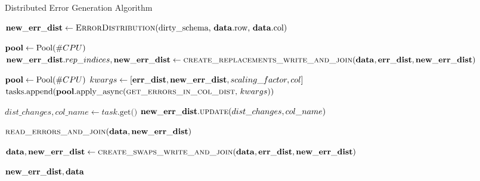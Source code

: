 \begin{algorithm}[!t]
    \caption{Distributed Error Generation Algorithm}\label{alg:dist_generator}
    \begin{algorithmic}[1] 
	  
	  \STATE $\mathbf{new\_err\_dist} \leftarrow \text{\textsc{ErrorDistribution}(dirty\_schema, \ensuremath{\mathbf{data}}.row, \ensuremath{\mathbf{data}}.col)}$
	  
	  
	  \STATE $\mathbf{pool} \leftarrow \text{Pool}(\#CPU)$
	   {
        \STATE $\mathbf{new\_err\_dist}.rep\_indices, \mathbf{new\_err\_dist} \leftarrow \textsc{create\_replacements\_write\_and\_join}(\mathbf{data}, \mathbf{err\_dist}, \mathbf{new\_err\_dist})$ 
      }\ENDFOR
	  
	  
	  \STATE $\mathbf{pool} \leftarrow \text{Pool}(\#CPU)$
	   {
	    \STATE $kwargs \leftarrow [\mathbf{err\_dist}, \mathbf{new\_err\_dist}, scaling\_factor, col]$ 
        \STATE $\text{tasks.append(\ensuremath{\mathbf{pool}}.apply\_async(\textsc{get\_errors\_in\_col\_dist},} \ kwargs\text{))}$ 
      }\ENDFOR 
      
	   {
        \STATE $dist\_changes, col\_name \leftarrow task\text{.get()}$ 
        \STATE $\mathbf{new\_err\_dist}.\textsc{update}(dist\_changes, col\_name)$ 
      }\ENDFOR 
      
      \STATE $\textsc{read\_errors\_and\_join}(\mathbf{data}, \mathbf{new\_err\_dist})$ 
      
      \STATE $\mathbf{data}, \mathbf{new\_err\_dist} \leftarrow \textsc{create\_swaps\_write\_and\_join}(\mathbf{data}, \mathbf{err\_dist}, \mathbf{new\_err\_dist})$ 
      
      \RETURN $\mathbf{new\_err\_dist}, \mathbf{data}$
    \end{algorithmic}
\end{algorithm}


